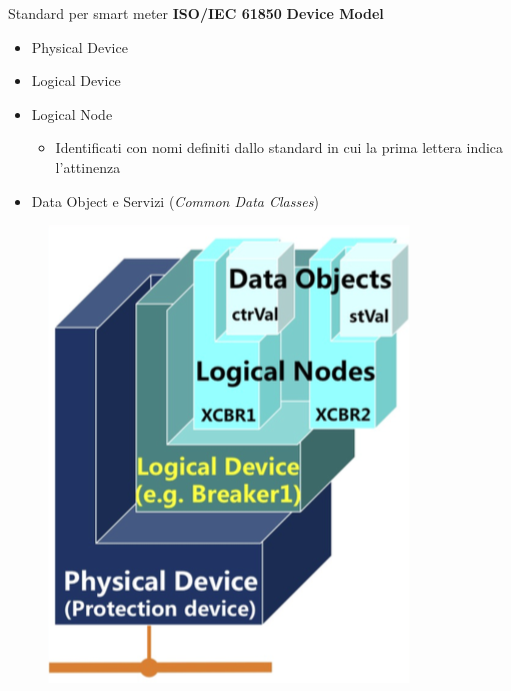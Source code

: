 \begin{frame}{Standard per smart meter}
\textbf{ISO/IEC 61850}
	\newline\textbf{Device Model}
	\begin{itemize}
		\item Physical Device
		\item Logical Device
		\item Logical Node
			\begin{itemize}
				\item Identificati con nomi definiti dallo standard in cui la prima lettera indica l'attinenza %
			\end{itemize}
		\item Data Object e Servizi (\textit{Common Data Classes})
	\end{itemize}
	\begin{figure}[h] 
		\includegraphics[scale=0.2,cfbox=blue_slides 1pt 0pt]{imgs/iec61850ln.png}
	\end{figure}
\end{frame}

